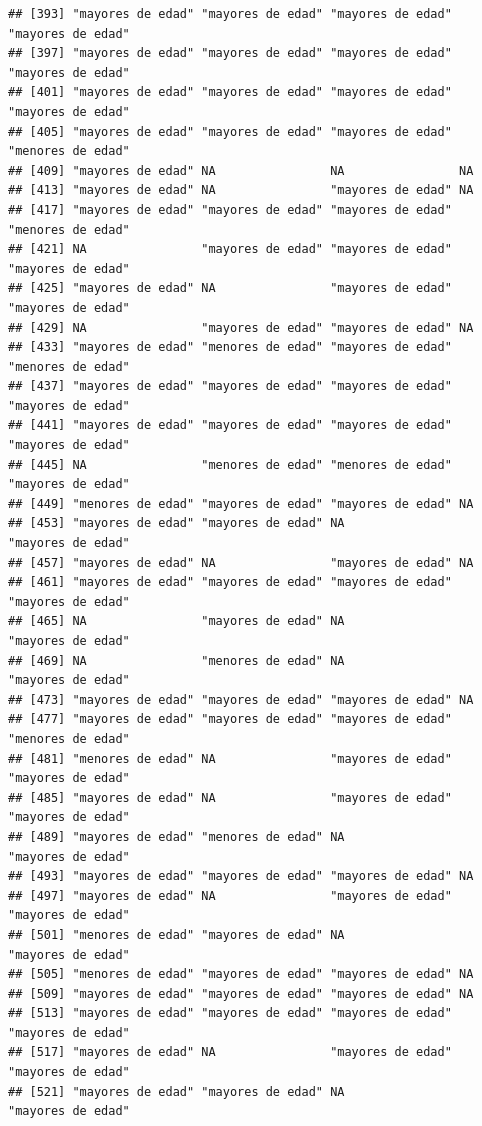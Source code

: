 \documentclass[11pt,]{book}
\begin{document}
\begin{verbatim}
## [393] "mayores de edad" "mayores de edad" "mayores de edad" "mayores de edad"
## [397] "mayores de edad" "mayores de edad" "mayores de edad" "mayores de edad"
## [401] "mayores de edad" "mayores de edad" "mayores de edad" "mayores de edad"
## [405] "mayores de edad" "mayores de edad" "mayores de edad" "menores de edad"
## [409] "mayores de edad" NA                NA                NA               
## [413] "mayores de edad" NA                "mayores de edad" NA               
## [417] "mayores de edad" "mayores de edad" "mayores de edad" "menores de edad"
## [421] NA                "mayores de edad" "mayores de edad" "mayores de edad"
## [425] "mayores de edad" NA                "mayores de edad" "mayores de edad"
## [429] NA                "mayores de edad" "mayores de edad" NA               
## [433] "mayores de edad" "menores de edad" "mayores de edad" "menores de edad"
## [437] "mayores de edad" "mayores de edad" "mayores de edad" "mayores de edad"
## [441] "mayores de edad" "mayores de edad" "mayores de edad" "mayores de edad"
## [445] NA                "menores de edad" "menores de edad" "mayores de edad"
## [449] "menores de edad" "mayores de edad" "mayores de edad" NA               
## [453] "mayores de edad" "mayores de edad" NA                "mayores de edad"
## [457] "mayores de edad" NA                "mayores de edad" NA               
## [461] "mayores de edad" "mayores de edad" "mayores de edad" "mayores de edad"
## [465] NA                "mayores de edad" NA                "mayores de edad"
## [469] NA                "menores de edad" NA                "mayores de edad"
## [473] "mayores de edad" "mayores de edad" "mayores de edad" NA               
## [477] "mayores de edad" "mayores de edad" "mayores de edad" "menores de edad"
## [481] "menores de edad" NA                "mayores de edad" "mayores de edad"
## [485] "mayores de edad" NA                "mayores de edad" "mayores de edad"
## [489] "mayores de edad" "menores de edad" NA                "mayores de edad"
## [493] "mayores de edad" "mayores de edad" "mayores de edad" NA               
## [497] "mayores de edad" NA                "mayores de edad" "mayores de edad"
## [501] "menores de edad" "mayores de edad" NA                "mayores de edad"
## [505] "menores de edad" "mayores de edad" "mayores de edad" NA               
## [509] "mayores de edad" "mayores de edad" "mayores de edad" NA               
## [513] "mayores de edad" "mayores de edad" "mayores de edad" "mayores de edad"
## [517] "mayores de edad" NA                "mayores de edad" "mayores de edad"
## [521] "mayores de edad" "mayores de edad" NA                "mayores de edad"

\end{verbatim}
\end{document}
